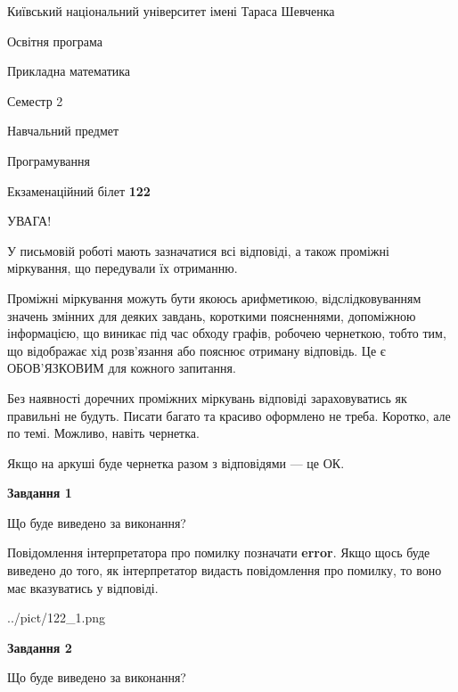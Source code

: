 \documentclass[12pt, ukrainian]{article}
\begin{document}
{{\begin {small}\par
{ \center  Київський національний університет імені Тараса Шевченка \par}
{\parbox {5 cm}{Освітня програма \hfill}{\parbox {7 cm}{Прикладна математика \hfill}}\parbox {6 cm}{\hfill Семестр 2}}\par
{\parbox {5 cm} {Навчальний предмет \hfill}\parbox {7 cm}{Програмування \hfill}\parbox {6cm}{\hfill}\par}\vspace{-7pt} \end{small}}{\center Екзаменаційний білет \No \textbf
{ 122 }\par}}
{
\begin {large}
УВАГА!

У письмовій роботі мають зазначатися всі відповіді, а також проміжні міркування, що передували їх отриманню.

Проміжні міркування можуть бути якоюсь арифметикою, відслідковуванням зна\-чень змінних для деяких завдань,
короткими поясненнями, допоміжною інформацією, що виникає під час обходу графів, робочею чернеткою,
тобто тим, що відображає хід розв’язання або пояснює отриману відповідь.
Це є ОБОВ’ЯЗКОВИМ для кожного запитання.

Без наявності доречних проміжних міркувань відповіді зараховуватись як правиль\-ні не будуть.
Писати багато та красиво оформлено не треба. Коротко, але по темі. Можли\-во, навіть чернетка.

Якщо на аркуші буде чернетка разом з відповідями --- це ОК.

\newpage

{\begin {center}\textbf{Завдання 1}\end {center}}\par
Що буде виведено за виконання?

Повідомлення інтерпретатора про помилку позначати \textbf{error}.
Якщо щось буде виведено до того, як інтерпретатор видасть повідомлення про помилку, 
то воно має вказуватись у відповіді. \par


\begin{center}
	{../pict/122_1.png}
\end{center}
\newpage

{\begin {center}\textbf{Завдання 2}\end {center}}\par
Що буде виведено за виконання?


\end{large}}
\end{document}
